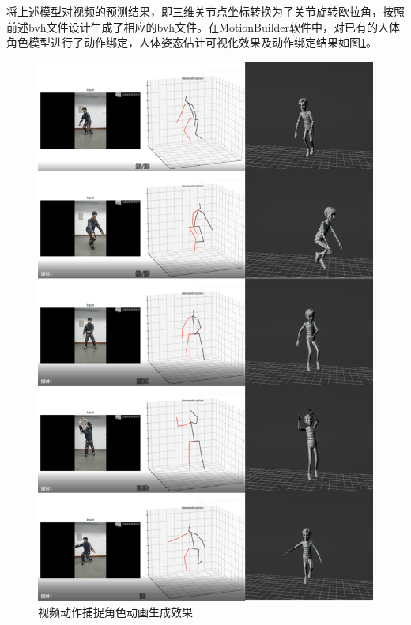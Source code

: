 将上述模型对视频的预测结果，即三维关节点坐标转换为了关节旋转欧拉角，按照前述bvh文件设计生成了相应的bvh文件。在MotionBuilder软件中，对已有的人体角色模型进行了动作绑定，人体姿态估计可视化效果及动作绑定结果如图\ref{fig:f31}。

\begin{figure}[h]
	\centering
	\includegraphics[scale=1]{figures/31.png}
	\caption{视频动作捕捉角色动画生成效果}
	\label{fig:f31}
\end{figure}
